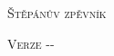 ﻿
\vspace*{\fill}
\begin{center}
\begin{Huge}
\textsc{Štěpánův zpěvník}
\end{Huge}
\textsc{\linebreak\linebreak Verze {\the\year}-{\formatTwoDigits{\the\month}}-{\formatTwoDigits{\the\day}}}
\end{center}
\vspace*{\fill}

\pagebreak